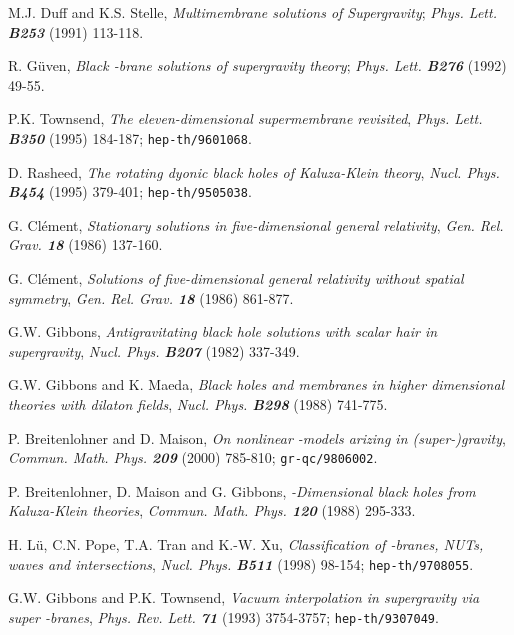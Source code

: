 \documentclass[a4paper,12pt]{article}
\begin{document}
\begin{thebibliography}{99}
    M.J. Duff and K.S. Stelle,
    {\sl Multimembrane solutions of \coordHE{} Supergravity};
    {\it Phys. Lett. \bf B253} (1991) 113-118.

    R. G\"uven,
    {\sl Black \coordHE{}-brane solutions of \coordHE{} supergravity theory};
    {\it Phys. Lett. \bf B276} (1992) 49-55.

    P.K. Townsend,
    {\sl The eleven-dimensional supermembrane revisited},
    {\it Phys. Lett. \bf B350} (1995) 184-187;
    {\tt hep-th/9601068}.

    D. Rasheed,
    {\sl The rotating dyonic black holes of Kaluza-Klein theory},
    {\it Nucl. Phys. \bf B454} (1995) 379-401;
    {\tt hep-th/9505038}.

    G. Cl\'ement,
    {\sl Stationary solutions in five-dimensional general relativity},
    {\it Gen. Rel. Grav. \bf 18} (1986) 137-160.

    G. Cl\'ement,
    {\sl Solutions of five-dimensional general relativity without
         spatial symmetry},
    {\it Gen. Rel. Grav. \bf 18} (1986) 861-877.

    G.W. Gibbons,
    {\sl Antigravitating black hole solutions with scalar hair in
         \coordHE{} supergravity},
    {\it Nucl. Phys. \bf B207} (1982) 337-349.

    G.W. Gibbons and K. Maeda,
    {\sl Black holes and membranes in higher dimensional theories
         with dilaton fields},
    {\it Nucl. Phys. \bf B298} (1988) 741-775.

    P. Breitenlohner and D. Maison,
    {\sl On nonlinear \myHighlight{$\sigma$}\coordHE{}-models arizing in (super-)gravity},
    {\it Commun. Math. Phys. \bf 209} (2000) 785-810;
    {\tt gr-qc/9806002}.

    P. Breitenlohner, D. Maison and G. Gibbons,
    {\sl {}\coordHE{}-Dimensional black holes from Kaluza-Klein theories},
    {\it Commun. Math. Phys. \bf 120} (1988) 295-333.

    H. L\"u, C.N. Pope, T.A. Tran and K.-W. Xu,
    {\sl Classification of \coordHE{}-branes, NUTs, waves and intersections},
    {\it Nucl. Phys. \bf B511} (1998) 98-154;
    {\tt hep-th/9708055}.

    G.W. Gibbons and P.K. Townsend,
    {\sl Vacuum interpolation in supergravity via super \coordHE{}-branes},
    {\it Phys. Rev. Lett. \bf 71} (1993) 3754-3757;
    {\tt hep-th/9307049}.


\end{thebibliography}
\end{document}
